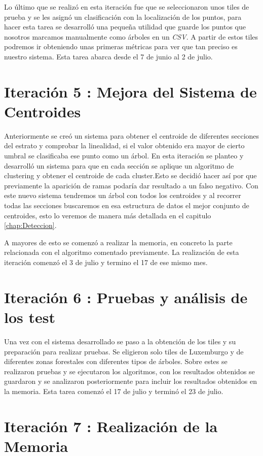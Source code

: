 Lo último que se realizó en esta iteración fue que se seleccionaron unos tiles de prueba y se les asignó un clasificación con la localización de los puntos, para hacer esta tarea se desarrolló una pequeña utilidad que guarde los puntos que nosotros marcamos manualmente como árboles en un \textit{CSV}. A partir de estos tiles podremos ir obteniendo unas primeras métricas para ver que tan preciso es nuestro sistema. Esta tarea abarca desde el 7 de junio al 2 de julio.

\section{Iteración 5 : Mejora del Sistema de Centroides}
Anteriormente se creó un sistema para obtener el centroide de diferentes secciones del estrato y comprobar la linealidad, si el valor obtenido era mayor de cierto umbral se clasificaba ese punto como un árbol. En esta iteración se planteo y desarrolló un sistema para que en cada sección se aplique un algoritmo de clustering y obtener el centroide de cada cluster.Esto se decidió hacer así por que previamente la aparición de ramas podaría dar resultado a un falso negativo. Con este nuevo sistema tendremos un árbol con todos los centroides y al recorrer todas las secciones buscaremos en esa estructura de datos el mejor conjunto de centroides, esto lo veremos de manera más detallada en el capitulo \ref{chap:Deteccion}.

A mayores de esto se comenzó a realizar la memoria, en concreto la parte relacionada con el algoritmo comentado previamente.
La realización de esta iteración comenzó el 3 de julio y termino el 17 de ese mismo mes.

\section{Iteración 6 : Pruebas y análisis de los test}
Una vez con el sistema desarrollado se paso a la obtención de los tiles y su preparación para realizar pruebas. Se eligieron solo tiles de Luxemburgo y de diferentes zonas forestales con diferentes tipos de árboles. Sobre estes se realizaron pruebas y se ejecutaron los algoritmos, con los resultados obtenidos se guardaron y se analizaron posteriormente para incluir los resultados obtenidos en la memoria. Esta tarea comenzó el 17 de julio y terminó el 23 de julio.

\section{Iteración 7 : Realización de la Memoria}

